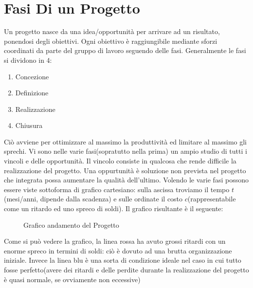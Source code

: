 \documentclass{report}
\begin{document}
\chapter{Fasi Di un Progetto}
Un progetto nasce da una idea/opportunità per arrivare ad un risultato, ponendosi degli obiettivi.
Ogni obiettivo è raggiungibile mediante sforzi coordinati da parte del gruppo di lavoro seguendo delle fasi.
Generalmente le fasi si dividono in 4:

\begin{enumerate}
\item Concezione
\item Definizione
\item Realizzazione
\item Chiusura	
\end{enumerate}

Ciò avviene per ottimizzare al massimo la produttività ed limitare al massimo gli sprechi.
Vi sono nelle varie fasi(sopratutto nella prima) un ampio studio di tutti i vincoli e delle opportunità.
Il vincolo consiste in qualcosa che rende difficile la realizzazione del progetto.
Una oppurtunità è soluzione non prevista nel progetto che integrata possa aumentare la qualità dell'ultimo.
Volendo le varie fasi possono essere viste sottoforma di grafico cartesiano:
sulla ascissa troviamo il tempo \(t\)(mesi/anni, dipende dalla scadenza) e sulle ordinate il costo \(c\)(rappresentabile come un ritardo ed uno spreco di soldi).
Il grafico risultante è il seguente:
\begin{figure}[h!]
\caption{Grafico andamento del Progetto}
\label{grap1}
\end{figure}

Come si può vedere la grafico, la linea rossa ha avuto grossi ritardi con un enorme spreco in termini di soldi: ciò è dovuto ad una brutta organizzazione iniziale.
Invece la linea blu è una sorta di condizione ideale nel caso in cui tutto fosse perfetto(avere dei ritardi e delle perdite durante la realizzazione del progetto è quasi normale, se ovviamente non eccessive)
\end{document}
